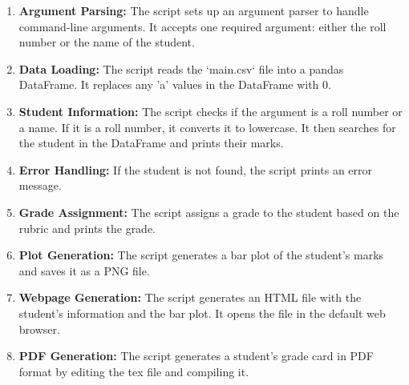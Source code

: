\documentclass{article}
\begin{document}
\begin{enumerate}
    \item \textbf{Argument Parsing:} The script sets up an argument parser to handle command-line arguments. It accepts one required argument: either the roll number or the name of the student.
    
    \item \textbf{Data Loading:} The script reads the `main.csv` file into a pandas DataFrame. It replaces any 'a' values in the DataFrame with 0.
    
    \item \textbf{Student Information:} The script checks if the argument is a roll number or a name. If it is a roll number, it converts it to lowercase. It then searches for the student in the DataFrame and prints their marks.
    
    \item \textbf{Error Handling:} If the student is not found, the script prints an error message.
    
    \item \textbf{Grade Assignment:} The script assigns a grade to the student based on the rubric and prints the grade.
    
    \item \textbf{Plot Generation:} The script generates a bar plot of the student's marks and saves it as a PNG file.
    
    \item \textbf{Webpage Generation:} The script generates an HTML file with the student's information and the bar plot. It opens the file in the default web browser.
    
    \item \textbf{PDF Generation:} The script generates a student's grade card in PDF format by editing the tex file and compiling it.
    
\end{enumerate}
\end{document}

